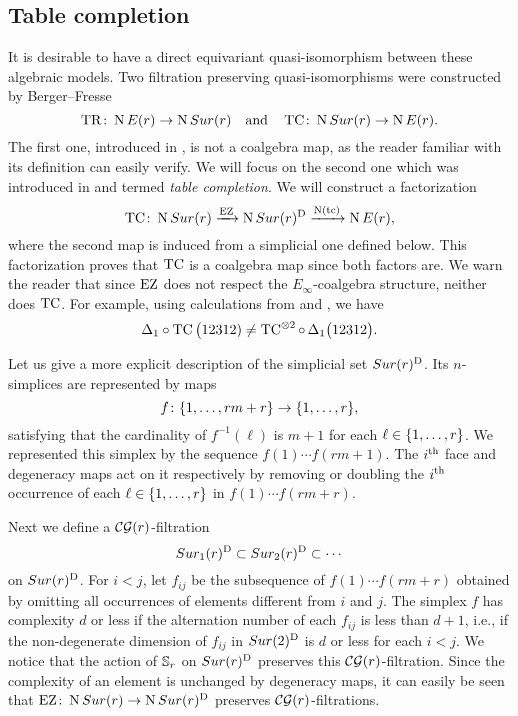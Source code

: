 \subsection{Table completion}\label{ss:table completion}

It is desirable to have a direct equivariant quasi-isomorphism between these algebraic models.
Two filtration preserving quasi-isomorphisms were constructed by Berger--Fresse
\[
\operatorname{TR} \colon \operatorname{N}E(r) \to \operatorname{N}Sur(r)
\quad \text{and} \quad
\operatorname{TC} \colon \operatorname{N}Sur(r) \to \operatorname{N} E(r).
\]
The first one, introduced in \cite[1$\cdot$3]{berger2004combinatorial}, is not a coalgebra map, as the reader familiar with its definition can easily verify.
We will focus on the second one which was introduced in \cite{berger2002prismatic} and termed \textit{table completion}.
We will construct a factorization
\[
\operatorname{TC} \colon \operatorname{N}Sur(r) \xrightarrow{\operatorname{EZ}} \operatorname{N}Sur(r)^{\mathrm{D}} \xrightarrow{\operatorname{N}(\operatorname{tc})} \operatorname{N} E(r),
\]
where the second map is induced from a simplicial one defined below.
This factorization proves that $\operatorname{TC}$ is a coalgebra map since both factors are.
We warn the reader that since $\operatorname{EZ}$ does not respect the $E_\infty$-coalgebra structure,
neither does $\operatorname{TC}$.
For example, using calculations from \cite{medina2022cube_einfty} and \cite{berger2002prismatic}, we have
\[
\Delta_1 \circ \operatorname{TC}\big(12312) \neq \operatorname{TC}^{\otimes 2} \circ \, \Delta_1 \big(12312\big).
\]

Let us give a more explicit description of the simplicial set $Sur(r)^{\mathrm{D}}$.
Its $n$-simplices are represented by maps
\[
f \colon \{1,\dots,rm + r\} \to \{1,\dots,r\},
\]
satisfying that the cardinality of $f^{-1}(\ell)$ is $m+1$ for each $\ell \in \{1,\dots,r\}$.
We represented this simplex by the sequence $f(1) \dotsb f(rm+1)$.
The $i^{\mathrm{th}}$ face and degeneracy maps act on it respectively by removing or doubling the $i^{\mathrm{th}}$ occurrence of each $\ell \in \{1,\dots,r\}$ in $f(1) \dotsb f(rm+r)$.

Next we define a $\mathcal{CG}(r)$-filtration
\[
Sur_1(r)^{\mathrm{D}} \subset Sur_2(r)^{\mathrm{D}} \subset \dotsb
\]
on $Sur(r)^{\mathrm{D}}$.
For $i<j$, let $f_{ij}$ be the subsequence of $f(1) \dotsm f(rm+r)$ obtained by omitting all occurrences of elements different from $i$ and $j$.
The simplex $f$ has complexity $d$ or less if
the alternation number of each $f_{ij}$ is less than $d+1$, i.e., if the non-degenerate dimension of $f_{ij}$ in $Sur(2)^{\mathrm{D}}$ is $d$ or less for each $i<j$.
We notice that the action of $\mathbb{S}_r$ on $Sur(r)^{\mathrm{D}}$ preserves this $\mathcal{CG}(r)$-filtration.
Since the complexity of an element is unchanged by degeneracy maps, it can easily be seen that $\operatorname{EZ} \colon \operatorname{N}Sur(r) \to \operatorname{N}Sur(r)^{\mathrm{D}}$ preserves $\mathcal{CG}(r)$-filtrations.

